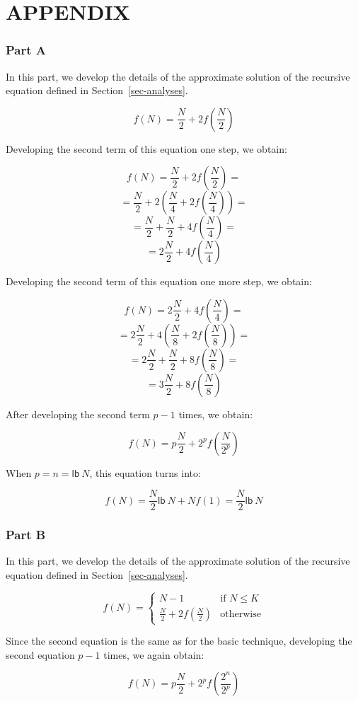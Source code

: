 
\vspace{1em}
\section*{APPENDIX}
\subsubsection*{Part A}
In this part, we develop the details of the approximate solution
of the recursive equation defined in Section~\ref{sec-analyses}.

\[ f(N) = \frac{N}{2} + 2f(\frac{N}{2}) \]

Developing the second term of this equation one step, we obtain:

\[ f(N) = \frac{N}{2} + 2f(\frac{N}{2}) = \]
\[ = \frac{N}{2} + 2(\frac{N}{4} + 2f(\frac{N}{4})) =\]
\[ = \frac{N}{2} + \frac{N}{2} + 4f(\frac{N}{4}) =\]
\[ = 2\frac{N}{2} + 4f(\frac{N}{4})\]

Developing the second term of this equation one more step, we obtain:

\[ f(N) = 2\frac{N}{2} + 4f(\frac{N}{4}) = \]
\[ = 2\frac{N}{2} + 4(\frac{N}{8} + 2f(\frac{N}{8})) =\]
\[ = 2\frac{N}{2} + \frac{N}{2} + 8f(\frac{N}{8}) =\]
\[ = 3\frac{N}{2} + 8f(\frac{N}{8}) \]

After developing the second term $p-1$ times, we obtain:

\[ f(N) = p\frac{N}{2} + 2^pf(\frac{N}{2^p})\]

When $p = n = \mathsf{lb}~N$, this equation turns into:

\[ f(N) = \frac{N}{2}\mathsf{lb}~N + Nf(1) = \frac{N}{2}\mathsf{lb}~N\]

\subsubsection*{Part B}
In this part, we develop the details of the approximate solution
of the recursive equation defined in Section~\ref{sec-analyses}.

\[ f(N) = \left\{ \begin{array}{ll}
    N-1 & \mbox{if $N \le K$} \\
    \frac{N}{2} + 2f(\frac{N}{2}) &\mbox{otherwise}
  \end{array} \right. \]

Since the second equation is the same as for the basic technique,
developing the second equation $p-1$ times, we again obtain:

\[ f(N) = p\frac{N}{2} + 2^pf(\frac{2^n}{2^p})\]

